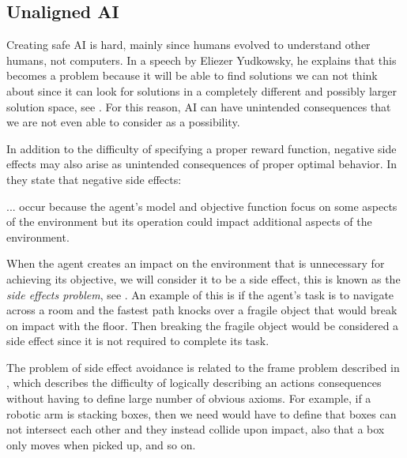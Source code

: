 \documentclass[12pt,A4]{report}
\theoremstyle{definition}
\begin{document}
\subsection{Unaligned AI}
Creating safe AI is hard, mainly since humans evolved to understand other humans, not computers. In a speech by Eliezer Yudkowsky, he explains that this becomes a problem because it will be able to find solutions we can not think about since it can look for solutions in a completely different and possibly larger solution space, see \citet{Yudkowsky16}. For this reason, AI can have unintended consequences that we are not even able to consider as a possibility. 

In addition to the difficulty of specifying a proper reward function, negative side effects may also arise as unintended consequences of proper optimal behavior. In \citet{Saisubramanian} they state that negative side effects:
\begin{displayquote}
  ... occur because the agent's model and objective function focus on some aspects of the environment but its operation could impact additional aspects of the environment.
\end{displayquote}

When the agent creates an impact on the environment that is unnecessary for achieving its objective, we will consider it to be a side effect, this is known as the \textit{side effects problem}, see \citet{Amodei}. An example of this is if the agent's task is to navigate across a room and the fastest path knocks over a fragile object that would break on impact with the floor. Then breaking the fragile object would be considered a side effect since it is not required to complete its task. 

The problem of side effect avoidance is related to the frame problem described in \citet{Mc69}, which describes the difficulty of logically describing an actions consequences without having to define large number of obvious axioms. For example, if a robotic arm is stacking boxes, then we need would have to define that boxes can not intersect each other and they instead collide upon impact, also that a box only moves when picked up, and so on.
\end{document}
